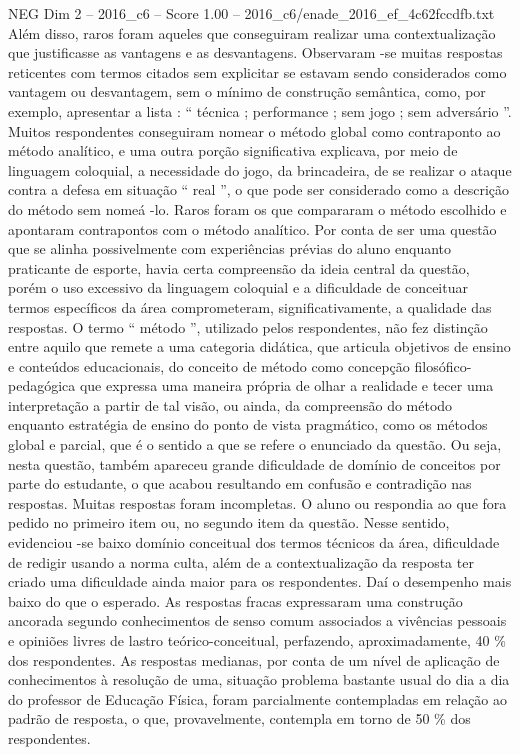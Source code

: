 \begin{textsample}{NEG Dim 2 – 2016\_c6 – Score 1.00 – 2016\_c6/enade\_2016\_ef\_4c62fccdfb.txt}
Além disso, raros foram aqueles que conseguiram realizar uma contextualização que justificasse as vantagens e as desvantagens.
Observaram -se muitas respostas reticentes com termos citados sem explicitar se estavam sendo considerados como vantagem ou desvantagem, sem o mínimo de construção semântica, como, por exemplo, apresentar a lista : “ técnica ; performance ; sem jogo ; sem adversário ”.
Muitos respondentes conseguiram nomear o método global como contraponto ao método analítico, e uma outra porção significativa explicava, por meio de linguagem coloquial, a necessidade do jogo, da brincadeira, de se realizar o ataque contra a defesa em situação “ real ”, o que pode ser considerado como a descrição do método sem nomeá -lo.
Raros foram os que compararam o método escolhido e apontaram contrapontos com o método analítico.
Por conta de ser uma questão que se alinha possivelmente com experiências prévias do aluno enquanto praticante de esporte, havia certa compreensão da ideia central da questão, porém o uso excessivo da linguagem coloquial e a dificuldade de conceituar termos específicos da área comprometeram, significativamente, a qualidade das respostas.
O termo “ método ”, utilizado pelos respondentes, não fez distinção entre aquilo que remete a uma categoria didática, que articula objetivos de ensino e conteúdos educacionais, do conceito de método como concepção filosófico-pedagógica que expressa uma maneira própria de olhar a realidade e tecer uma interpretação a partir de tal visão, ou ainda, da compreensão do método enquanto estratégia de ensino do ponto de vista pragmático, como os métodos global e parcial, que é o sentido a que se refere o enunciado da questão.
Ou seja, nesta questão, também apareceu grande dificuldade de domínio de conceitos por parte do estudante, o que acabou resultando em confusão e contradição nas respostas.
Muitas respostas foram incompletas.
O aluno ou respondia ao que fora pedido no primeiro item ou, no segundo item da questão.
Nesse sentido, evidenciou -se baixo domínio conceitual dos termos técnicos da área, dificuldade de redigir usando a norma culta, além de a contextualização da resposta ter criado uma dificuldade ainda maior para os respondentes.
Daí o desempenho mais baixo do que o esperado.
As respostas fracas expressaram uma construção ancorada segundo conhecimentos de senso comum associados a vivências pessoais e opiniões livres de lastro teórico-conceitual, perfazendo, aproximadamente, 40 \% dos respondentes.
As respostas medianas, por conta de um nível de aplicação de conhecimentos à resolução de uma, situação problema bastante usual do dia a dia do professor de Educação Física, foram parcialmente contempladas em relação ao padrão de resposta, o que, provavelmente, contempla em torno de 50 \% dos respondentes.

\end{textsample}
